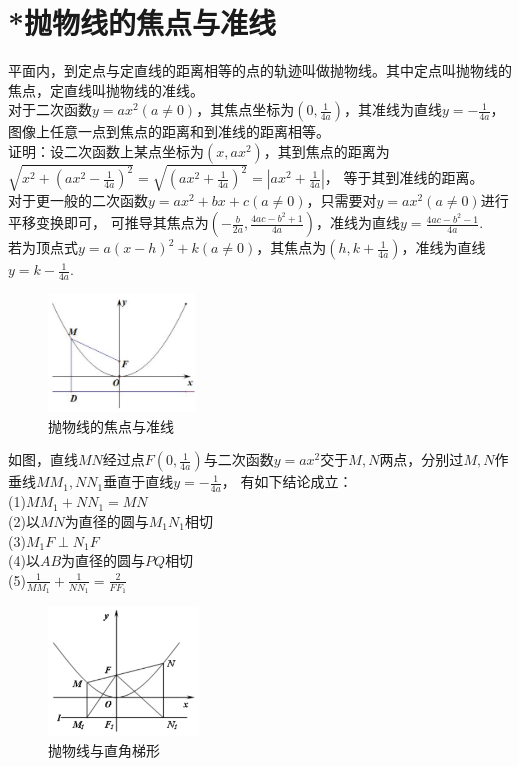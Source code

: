\documentclass{ecnuthesis}
\begin{document}
\section{*抛物线的焦点与准线}
\begin{knowledge}
    平面内，到定点与定直线的距离相等的点的轨迹叫做抛物线。其中定点叫抛物线的焦点，定直线叫抛物线的准线。\\
    对于二次函数$y=ax^2(a\ne 0)$，其焦点坐标为$(0,\frac{1}{4a})$，其准线为直线$y=-\frac{1}{4a}$，图像上任意一点到焦点的距离和到准线的距离相等。\\
    证明：设二次函数上某点坐标为$(x,ax^2)$，其到焦点的距离为$\sqrt{x^2+(ax^2-\frac{1}{4a})^2}=\sqrt{(ax^2+\frac{1}{4a})^2}=|ax^2+\frac{1}{4a}|$，
    等于其到准线的距离。\\
    对于更一般的二次函数$y=ax^2+bx+c(a\ne 0)$，只需要对$y=ax^2(a\ne 0)$进行平移变换即可，
    可推导其焦点为$(-\frac{b}{2a},\frac{4ac-b^2+1}{4a})$，准线为直线$y=\frac{4ac-b^2-1}{4a}$. \\
    若为顶点式$y=a(x-h)^2+k(a \ne 0)$，其焦点为$(h,k+\frac{1}{4a})$，准线为直线$y=k-\frac{1}{4a}$. \\
\end{knowledge}
\begin{figure}[H]
\centering
\includegraphics[width=4cm]{picture/1003.png}
\caption{抛物线的焦点与准线}
\end{figure}
\begin{model}
    如图，直线$MN$经过点$F(0,\frac{1}{4a})$与二次函数$y=ax^2$交于$M,N$两点，分别过$M,N$作垂线$MM_1,NN_1$垂直于直线$y=-\frac{1}{4a}$，
    有如下结论成立：\\
    (1)$MM_1+NN_1=MN$ \\
    (2)以$MN$为直径的圆与$M_1N_1$相切 \\
    (3)$M_1F \perp N_1F$ \\
    (4)以$AB$为直径的圆与$PQ$相切 \\
    (5)$\frac{1}{MM_1}+\frac{1}{NN_1}=\frac{2}{FF_1}$
\end{model}
\begin{figure}[H]
\centering
\includegraphics[width=4cm]{picture/1004.png}
\caption{抛物线与直角梯形}
\end{figure}
\end{document}
